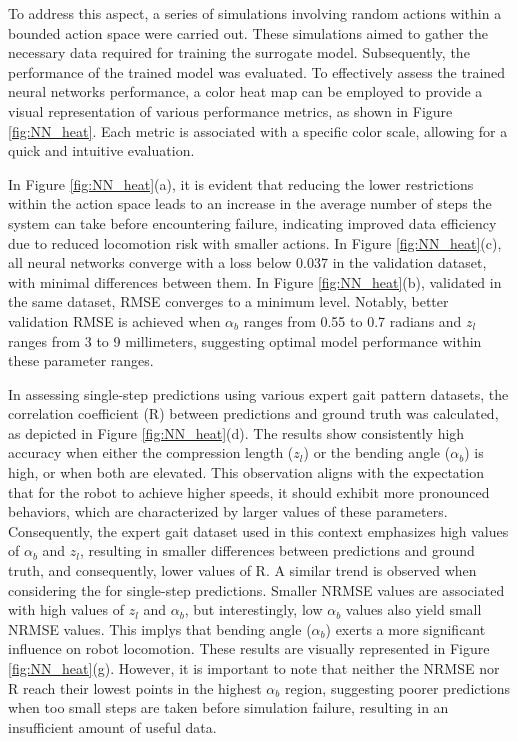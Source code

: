 To address this aspect, a series of simulations involving random actions within a bounded action space were carried out. These simulations aimed to gather the necessary data required for training the surrogate model. Subsequently, the performance of the trained model was evaluated. To effectively assess the trained neural networks performance, a color heat map can be employed to provide a visual representation of various performance metrics, as shown in Figure \ref{fig:NN_heat}. Each metric is associated with a specific color scale, allowing for a quick and intuitive evaluation.

In Figure \ref{fig:NN_heat}(a), it is evident that reducing the lower restrictions within the action space leads to an increase in the average number of steps the system can take before encountering failure, indicating improved data efficiency due to reduced locomotion risk with smaller actions. In Figure \ref{fig:NN_heat}(c), all neural networks converge with a loss below 0.037 in the validation dataset, with minimal differences between them. In Figure \ref{fig:NN_heat}(b), validated in the same dataset, RMSE converges to a minimum level. Notably, better validation RMSE is achieved when $\alpha_b$ ranges from 0.55 to 0.7 radians and $z_l$ ranges from 3 to 9 millimeters, suggesting optimal model performance within these parameter ranges.

In assessing single-step predictions using various expert gait pattern datasets, the correlation coefficient (R) between predictions and ground truth was calculated, as depicted in Figure \ref{fig:NN_heat}(d). The results show consistently high accuracy when either the compression length ($z_l$) or the bending angle ($\alpha_b$) is high, or when both are elevated. This observation aligns with the expectation that for the robot to achieve higher speeds, it should exhibit more pronounced behaviors, which are characterized by larger values of these parameters. Consequently, the expert gait dataset used in this context emphasizes high values of $\alpha_b$ and $z_l$, resulting in smaller differences between predictions and ground truth, and consequently, lower values of R. A similar trend is observed when considering the for single-step predictions. Smaller NRMSE values are associated with high values of $z_l$ and $\alpha_b$, but interestingly, low $\alpha_b$ values also yield small NRMSE values. This implys that bending angle ($\alpha_b$) exerts a more significant influence on robot locomotion. These results are visually represented in Figure \ref{fig:NN_heat}(g). However, it is important to note that neither the NRMSE nor R reach their lowest points in the highest $\alpha_b$ region, suggesting poorer predictions when too small steps are taken before simulation failure, resulting in an insufficient amount of useful data.

